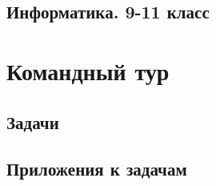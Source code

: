 \documentclass[a4paper,12pt,oneside]{book}
\begin{document}
\section{Информатика. 9-11 класс}


\chapter{Командный тур}

\section{Задачи} 



\section{Приложения к задачам}


\end{document}
